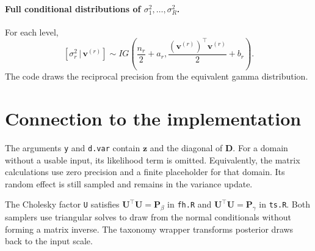 \documentclass[11pt]{article}
\newcommand{\bb}[1]{\boldsymbol{#1}}
\newcommand{\given}{\,|\,}
\begin{document}
\paragraph{Full conditional distributions of $\sigma_1^2,\ldots,\sigma_R^2$.}
For each level,
\[
 [\sigma_r^2\given\bb v^{(r)}]\sim
 IG\left(\frac{n_r}{2}+a_r,\frac{(\bb v^{(r)})^\top\bb v^{(r)}}{2}+b_r\right).
\]
The code draws the reciprocal precision from the equivalent gamma distribution.

\section*{Connection to the implementation}
The arguments \texttt{y} and \texttt{d.var} contain $\bb z$ and the diagonal of $\bb D$.
For a domain without a usable input, its likelihood term is omitted.
Equivalently, the matrix calculations use zero precision and a finite placeholder for that domain.
Its random effect is still sampled and remains in the variance update.

The Cholesky factor \texttt{U} satisfies $\bb U^\top\bb U=\bb P_\beta$ in \texttt{fh.R} and $\bb U^\top\bb U=\bb P_\gamma$ in \texttt{ts.R}.
Both samplers use triangular solves to draw from the normal conditionals without forming a matrix inverse.
The taxonomy wrapper transforms posterior draws back to the input scale.
\end{document}
